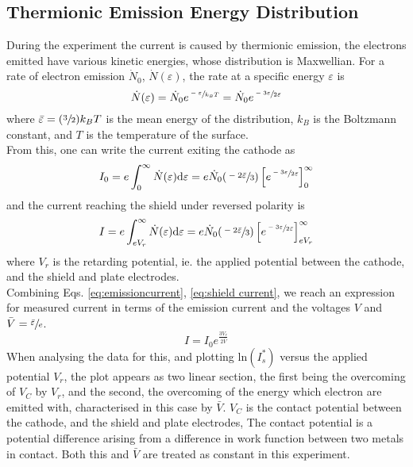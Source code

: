 \documentclass{article}
\begin{document}
\subsection{Thermionic Emission Energy Distribution}
During the experiment the current is caused by thermionic emission, the electrons emitted have various kinetic energies, whose distribution is Maxwellian. For a rate of electron emission $\dot{N}_0$, $\dot{N}(\varepsilon)$, the rate at a specific energy $\varepsilon$ is
\begin{equation}
\dot{N}(\varepsilon)=\dot{N}_0e^{\sfrac{-\varepsilon}{k_BT}}=\dot{N}_0e^{\sfrac{-3\varepsilon}{2\bar{\varepsilon}}}
\end{equation}
where $\bar{\varepsilon}=(\sfrac{3}{2})k_BT$ is the mean energy of the distribution, $k_B$ is the Boltzmann constant, and $T$ is the temperature of the surface.\\
\indent From this, one can write the current exiting the cathode as
\begin{equation}
I_0=e\int_0^{\infty}\dot{N}(\varepsilon)\mathrm{d}\varepsilon = e\dot{N}_0(\sfrac{-2\bar{\varepsilon}}{3})\left[e^{\sfrac{-3\varepsilon}{2\bar{\varepsilon}}}\right]^{\infty}_0
\label{eq:emissioncurrent}
\end{equation}
and the current reaching the shield under reversed polarity is
\begin{equation}
I=e\int_{eV_r}^{\infty}\dot{N}(\varepsilon)\mathrm{d}\varepsilon = e\dot{N}_0(\sfrac{-2\bar{\varepsilon}}{3})\left[e^{\sfrac{-3\varepsilon}{2\bar{\varepsilon}}}\right]^{\infty}_{eV_r}
\label{eq:shield current}
\end{equation}
where $V_r$ is the retarding potential, ie. the applied potential between the cathode, and the shield and plate electrodes.\\
\indent Combining Eqs. \ref{eq:emissioncurrent}, \ref{eq:shield current}, we reach an expression for measured current in terms of the emission current and the voltages $V$ and $\bar{V}=\sfrac{\bar{\varepsilon}}{e}$.\\
\begin{equation}
I=I_0e^{\frac{3V_r}{2\bar{V}}}
\end{equation}
When analysing the data for this, and plotting $\mathrm{ln}(I^*_s)$ versus the applied potential $V_r$, the plot appears as two linear section, the first being the overcoming of $V_C$ by $V_r$, and the second, the overcoming of the energy which electron are emitted with, characterised in this case by $\bar{V}$.  $V_C$ is the contact potential between the cathode, and the shield and plate electrodes, The contact potential is a potential difference arising from a difference in work function between two metals in contact. Both this and $\bar{V}$ are treated as constant in this experiment. \\
\end{document}
